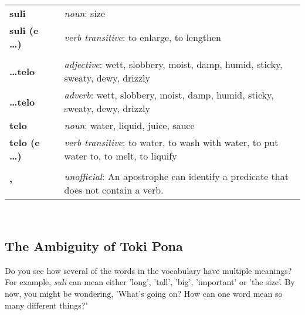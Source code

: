 \begin{supertabular}{p{2,5cm}|ll}
    \textbf{suli}           &  & \textit{noun}: size                                                                                     \\ %
    \textbf{suli (e \dots)} &  & \textit{verb transitive}: to enlarge, to lengthen                                                       \\ %
                            &  &                                                                                                         \\ %
    \textbf{\dots telo}     &  & \textit{adjective}: wett, slobbery, moist, damp, humid, sticky, sweaty, dewy, drizzly                   \\ %
    \textbf{\dots telo}     &  & \textit{adverb}: wett, slobbery, moist, damp, humid, sticky, sweaty, dewy, drizzly                      \\ %
    \textbf{telo}           &  & \textit{noun}: water, liquid, juice, sauce                                                              \\ %
    \textbf{telo (e \dots)} &  & \textit{verb transitive}: to water, to wash with water, to put water to, to melt, to liquify            \\ %
                            &  &                                                                                                         \\ %
    \textbf{'}              &  & \textit{unofficial}: An apostrophe can identify a predicate that does not contain a verb.               \\ %
\end{supertabular} \\
%
\newpage
\subsection*{The Ambiguity of Toki Pona}
%
%
Do you see how several of the words in the vocabulary have multiple meanings?
For example, \textit{suli} can mean either 'long', 'tall', 'big', 'important' or 'the size'.
By now, you might be wondering, 'What's going on? How can one word mean so many different things?'

